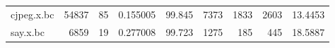 \begin{table}[ht]
\begin{adjustbox}{width=1.3\textwidth}
\begin{tabular}{lrrrrrrrr}
 cjpeg.x.bc           &         54837 &                  85 &      0.155005  &       99.845  &               7373 &                             1833 &                        2603 &       13.4453  \\
 say.x.bc             &          6859 &                  19 &      0.277008  &       99.723  &               1275 &                              185 &                         445 &       18.5887  \\
\hline
\end{tabular}
\end{adjustbox}
\end{table}

\begin{table}[ht]
\centering
\begin{adjustbox}{width=1.3\textwidth}


\end{adjustbox}
\end{table}
